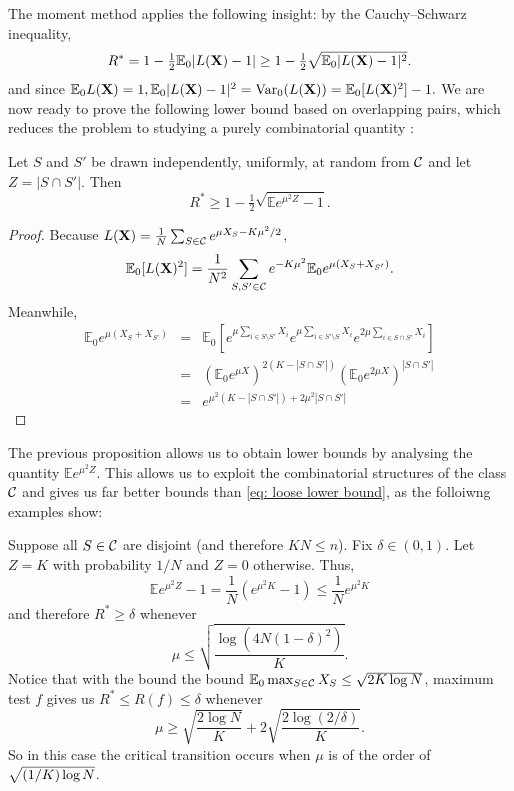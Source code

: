 \documentclass[10pt, oneside]{article}
\begin{document}
The moment method applies the following insight: by the Cauchy--Schwarz inequality,
%
\[
R^* = 1 - \tfrac{1}{2} \mathbb{E}_0 |L(\mathbf{X})-1|
\ge1 - \tfrac{1}{2} \sqrt{\mathbb{E}_0 |L(\mathbf{X})-1|^2}.
\]
and since $\mathbb{E}_0 L(\mathbf{X}) = 1, \mathbb{E}_0 |L(\mathbf{X})-1|^2=\operatorname{Var}_0(L(\mathbf{X})) = \mathbb{E}_0 [L(\mathbf{X})^2] -1.$ 
We are now ready to prove the following lower bound based on overlapping pairs, which reduces the problem to
studying a purely combinatorial quantity \cite{arias2008searching,addario2010combinatorial}:
\begin{prop}
  \label{prop:pairs}
  Let $S$ and $S'$ be drawn independently, uniformly, at random from ${\mathcal C}$
  and let $Z=|S\cap S'|$. Then
  \[
  R^* \ge1- \tfrac{1}{2} \sqrt{\mathbb{E} e^{\mu^2 Z} -1}.
  \]
\end{prop}
\begin{proof}
Because $L(\mathbf{X})= \frac1 N \sum_{S\in{\mathcal C}} e^{\mu X_S -K\mu^2/2}$, 
\[
\mathbb{E}_0 [L(\mathbf{X})^2]
=
\frac{1}{N^2} \sum_{S,S'\in{\mathcal C}} e^{-K \mu^2} \mathbb{E}_0 e^{\mu(X_S+X_{S'})}.
\]
Meanwhile,
\begin{eqnarray*}
\mathbb{E}_0 e^{\mu(X_S+X_{S'})}
& = &
\mathbb{E}_0 [ e^{\mu\sum_{i\in S\setminus S'} X_i} e^{\mu\sum_{i\in
S'\setminus S} X_i}
e^{2\mu\sum_{i\in S\cap S'} X_i} ] \\
& = &
(\mathbb{E}_0 e^{\mu X} )^{2(K-|S\cap S'|)} (\mathbb{E}_0 e^{2\mu X}
)^{|S\cap S'|}
\\
& = &
e^{\mu^2 (K-|S\cap S'|)+2\mu^2|S\cap S'|}
\end{eqnarray*}
\end{proof}

The previous proposition allows us to obtain lower bounds by analysing the quantity $\mathbb{E} e^{\mu^2Z}$. 
This allows us to exploit the combinatorial structures of the class ${\mathcal C}$ and gives us far better bounds than \ref{eq: loose lower bound}, as the folloiwng examples show:


\begin{exmp}
  \label{exmp: Disjoint Sets}
  Suppose all $S\in{\mathcal C}$ are disjoint (and therefore $KN\le n$). Fix $\delta\in(0,1)$. Let $Z = K$ with probability $1/N$ and $Z = 0$ otherwise. Thus,
  \[
  \mathbb{E} e^{\mu^2Z} -1 = \frac{1}{N} (e^{\mu^2 K} -1 )
  \le\frac{1}{N} e^{\mu^2 K}
  \]
  and therefore $R^* \ge\delta$ whenever
  \[
  \mu\le\sqrt{\frac{\log(4N(1-\delta)^2)}{K}}.
  \]
  Notice that with the bound the bound $\mathbb{E}_0 \max_{S\in{\mathcal C}} X_S \le\sqrt{2K\log N}$, maximum test $f$ gives us $R^* \le R(f) \le\delta$
  whenever
  \[
  \mu\ge\sqrt{\frac{2\log N}{K}} + 2\sqrt{\frac{2\log(2/\delta)}{K}}.
  \]
  So in this case the critical transition occurs when $\mu$ is of the order
of $\hspace*{-0.2pt}\sqrt{(1/K)\hspace*{-0.2pt}\log\hspace*{-0.25pt} N}$.
\end{exmp}
\end{document}
